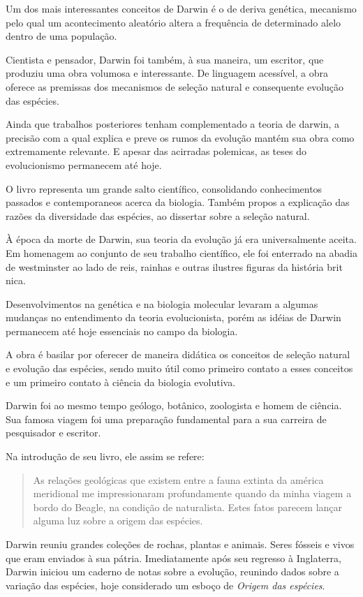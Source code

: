 \documentclass[12pt]{extarticle}
\begin{document}
Um dos mais interessantes conceitos de Darwin é o de deriva genética,  mecanismo pelo qual um acontecimento aleatório altera a frequência de
determinado alelo dentro de uma população.

Cientista e pensador, Darwin foi também, à sua maneira, um escritor, que
produziu uma obra volumosa e interessante.
De linguagem acessível, a obra oferece as premissas dos mecanismos de seleção
natural e consequente evolução das espécies.

Ainda que trabalhos posteriores tenham complementado a teoria de darwin,
a precisão com a qual explica e preve os rumos da evolução mantém sua obra como
extremamente relevante.
E apesar das acirradas polemicas, as teses do evolucionismo permanecem até hoje.


O livro representa um grande salto científico, consolidando conhecimentos
passados e contemporaneos acerca da biologia.
Também propos a explicação das razões da diversidade das espécies,    ao
dissertar sobre a seleção natural.

À época da morte de Darwin, sua teoria da evolução já era universalmente
aceita. 
Em homenagem ao conjunto de seu trabalho científico, ele foi enterrado na
abadia de westminster ao lado de reis, rainhas e outras ilustres figuras da
história brit nica. 

Desenvolvimentos na genética e na biologia molecular levaram a algumas mudanças
no entendimento da teoria evolucionista, porém as idéias de Darwin permanecem
até hoje essenciais no campo da biologia.

A obra é basilar por oferecer de maneira didática os conceitos de seleção
natural e evolução das espécies, sendo muito útil como primeiro contato a esses
conceitos e um primeiro contato à ciência da biologia evolutiva.

Darwin foi ao mesmo tempo geólogo, botânico, zoologista e homem de ciência. 
Sua famosa viagem foi uma preparação fundamental para a sua carreira de
pesquisador e escritor. 

Na introdução de seu livro, ele assim se refere:  

\begin{quote}
As relações
geológicas que existem entre a fauna extinta da américa meridional me
impressionaram profundamente quando da minha viagem a bordo do Beagle, na
condição de naturalista.  Estes fatos parecem lançar alguma luz sobre a origem
das espécies.
\end{quote} 

Darwin reuniu grandes coleções de rochas, plantas
e animais. Seres fósseis e vivos que eram enviados à sua pátria. 
Imediatamente após seu regresso à Inglaterra, Darwin iniciou um caderno de
notas sobre a evolução, reunindo dados sobre a variação das espécies,
hoje considerado um esboço de \textit{Origem das espécies}. 
\end{document}
